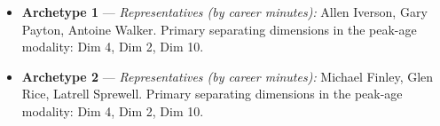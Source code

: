 \begin{itemize}
\item \textbf{Archetype 1} --- \emph{Representatives (by career minutes):} Allen Iverson, Gary Payton, Antoine Walker. Primary separating dimensions in the peak-age modality: Dim 4, Dim 2, Dim 10.
\item \textbf{Archetype 2} --- \emph{Representatives (by career minutes):} Michael Finley, Glen Rice, Latrell Sprewell. Primary separating dimensions in the peak-age modality: Dim 4, Dim 2, Dim 10.
\end{itemize}
